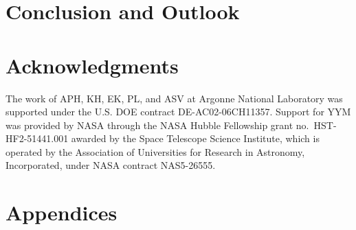 \documentclass[11pt]{report}
\begin{document}
\section{Conclusion and Outlook}
\label{sec:outlook}


\clearpage

\section*{Acknowledgments}



The work of APH, KH, EK, PL, and ASV at Argonne National Laboratory was supported under the U.S. DOE contract DE-AC02-06CH11357.
Support for YYM was provided by NASA through the NASA Hubble Fellowship grant no.\ HST-HF2-51441.001 awarded by the Space Telescope Science Institute, which is operated by the Association of Universities for Research in Astronomy, Incorporated, under NASA contract NAS5-26555. 



\clearpage





\clearpage
\appendix
\renewcommand\thefigure{\thesection\arabic{figure}}
\renewcommand\thetable{\thesection\arabic{table}}
\renewcommand{\thesection}{\Alph{section}}
\renewcommand{\thesubsection}{\Alph{section}\arabic{subsection}}

\section*{Appendices}
\end{document}
